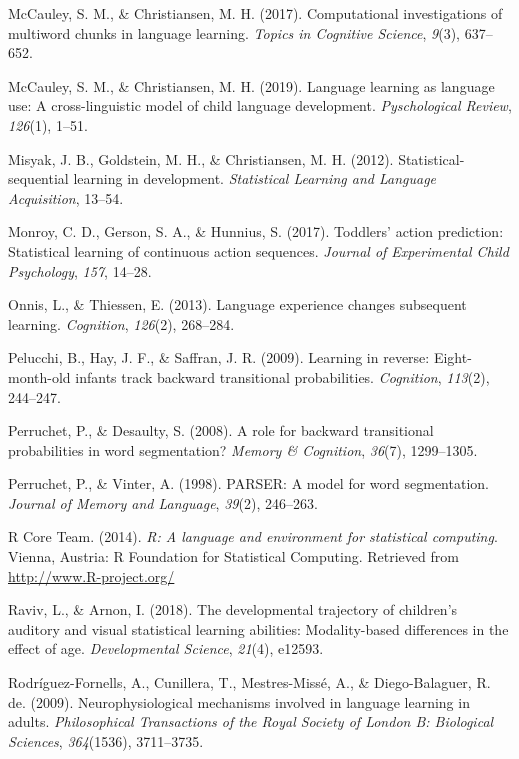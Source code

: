 \documentclass[man,mask,floatsintext]{apa6}
\begin{document}
\hypertarget{ref-mccauley2017computational}{}
McCauley, S. M., \& Christiansen, M. H. (2017). Computational
investigations of multiword chunks in language learning. \emph{Topics in
Cognitive Science}, \emph{9}(3), 637--652.

\hypertarget{ref-mccauley2019languagelearning}{}
McCauley, S. M., \& Christiansen, M. H. (2019). Language learning as
language use: A cross-linguistic model of child language development.
\emph{Pyschological Review}, \emph{126}(1), 1--51.

\hypertarget{ref-misyak2012statistical}{}
Misyak, J. B., Goldstein, M. H., \& Christiansen, M. H. (2012).
Statistical-sequential learning in development. \emph{Statistical
Learning and Language Acquisition}, 13--54.

\hypertarget{ref-monroy2017toddlers}{}
Monroy, C. D., Gerson, S. A., \& Hunnius, S. (2017). Toddlers' action
prediction: Statistical learning of continuous action sequences.
\emph{Journal of Experimental Child Psychology}, \emph{157}, 14--28.

\hypertarget{ref-onnis2013language}{}
Onnis, L., \& Thiessen, E. (2013). Language experience changes
subsequent learning. \emph{Cognition}, \emph{126}(2), 268--284.

\hypertarget{ref-pelucchi2009learning}{}
Pelucchi, B., Hay, J. F., \& Saffran, J. R. (2009). Learning in reverse:
Eight-month-old infants track backward transitional probabilities.
\emph{Cognition}, \emph{113}(2), 244--247.

\hypertarget{ref-perruchet2008role}{}
Perruchet, P., \& Desaulty, S. (2008). A role for backward transitional
probabilities in word segmentation? \emph{Memory \& Cognition},
\emph{36}(7), 1299--1305.

\hypertarget{ref-perruchet1998parser}{}
Perruchet, P., \& Vinter, A. (1998). PARSER: A model for word
segmentation. \emph{Journal of Memory and Language}, \emph{39}(2),
246--263.

\hypertarget{ref-R}{}
R Core Team. (2014). \emph{R: A language and environment for statistical
computing}. Vienna, Austria: R Foundation for Statistical Computing.
Retrieved from \url{http://www.R-project.org/}

\hypertarget{ref-raviv2018developmental}{}
Raviv, L., \& Arnon, I. (2018). The developmental trajectory of
children's auditory and visual statistical learning abilities:
Modality-based differences in the effect of age. \emph{Developmental
Science}, \emph{21}(4), e12593.

\hypertarget{ref-rodriguez2009neurophysiological}{}
Rodríguez-Fornells, A., Cunillera, T., Mestres-Missé, A., \&
Diego-Balaguer, R. de. (2009). Neurophysiological mechanisms involved in
language learning in adults. \emph{Philosophical Transactions of the
Royal Society of London B: Biological Sciences}, \emph{364}(1536),
3711--3735.
\end{document}
